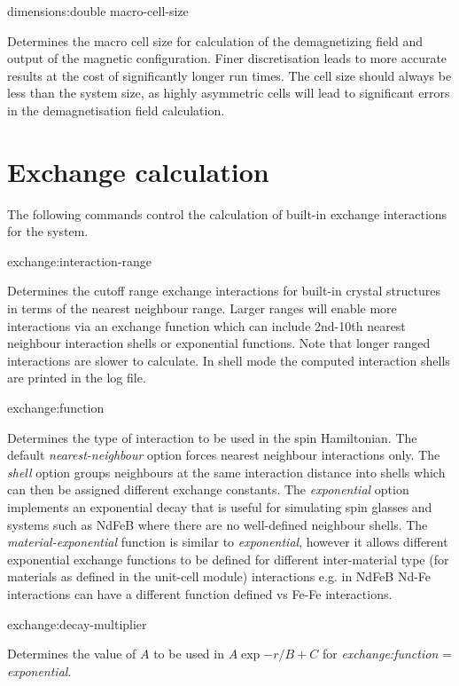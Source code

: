 {\zicf dimensions:double macro-cell-size}
Determines the macro cell size for calculation of the demagnetizing field and
output of the magnetic configuration. Finer discretisation leads to more
accurate results at the cost of significantly longer run times. The cell size
should always be less than the system size, as highly asymmetric cells will lead
to significant errors in the demagnetisation field calculation.

\section*{Exchange calculation}
The following commands control the calculation of built-in exchange interactions
for the system.

{\zicf exchange:interaction-range}
Determines the cutoff range exchange interactions for built-in crystal structures
in terms of the nearest neighbour range. Larger ranges will enable more interactions
via an exchange function which can include 2nd-10th nearest neighbour interaction
shells or exponential functions. Note that longer ranged interactions are slower
to calculate. In shell mode the computed interaction shells are printed in the
log file.

{\zicf exchange:function}
Determines the type of interaction to be used in the spin Hamiltonian. The
default \textit{nearest-neighbour} option forces nearest neighbour interactions
only. The \textit{shell} option groups neighbours at the same interaction
distance into shells which can then be assigned different exchange constants.
The \textit{exponential} option implements an exponential decay that is useful
for simulating spin glasses and systems such as NdFeB where there are no
well-defined neighbour shells. The \textit{material-exponential} function is
similar to \textit{exponential}, however it allows different exponential
exchange functions to be defined for different inter-material type (for
materials as defined in the unit-cell module) interactions e.g. in NdFeB
Nd-Fe interactions can have a different function defined vs Fe-Fe interactions.

{\zicf exchange:decay-multiplier}
Determines the value of $A$ to be used in $A\exp{-r/B}+C$ for
\textit{exchange:function} = \textit{exponential}.

